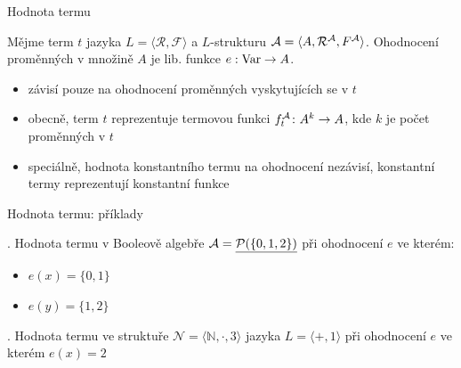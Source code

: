 \documentclass{beamer}
\begin{document}
\begin{frame}{Hodnota termu}

    Mějme term $t$ jazyka $L=\langle \mathcal R,\mathcal F\rangle$ a $L$-strukturu $\mathcal{A}=\langle A,\mathcal R^{\mathcal{A}},F^{\mathcal{A}}\rangle$. \pause\alert{Ohodnocení proměnných} v množině $A$ je lib. funkce $e:\operatorname{Var}\to A$.\pause
    

    \pause
    \begin{itemize}
        \item závisí pouze na ohodnocení proměnných vyskytujících se v $t$\pause
        \item obecně, term $t$ reprezentuje \alert{termovou funkci} $f_t^{\mathcal{A}}\colon A^k\to A$, kde $k$ je počet proměnných v $t$\pause
        \item speciálně, hodnota konstantního termu na ohodnocení nezávisí, konstantní termy reprezentují konstantní funkce
    \end{itemize}
    
\end{frame}


\begin{frame}{Hodnota termu: příklady}
    
    . Hodnota termu  v Booleově algebře $\mathcal{A}=\underline{\mathcal P(\{0,1,2\})}$ při ohodnocení $e$ ve kterém:
        \begin{itemize}
            \item $e(x)=\{0,1\}$
            \item $e(y)=\{1,2\}$
        \end{itemize}
  
        \pause
    
    \bigskip\bigskip

    . Hodnota termu  ve struktuře $\mathcal N=\langle\mathbb N,\cdot,3\rangle$ jazyka $L=\langle +,1\rangle$ při ohodnocení $e$ ve kterém $e(x)=2$ 

         \pause
    
\end{frame}
\end{document}
